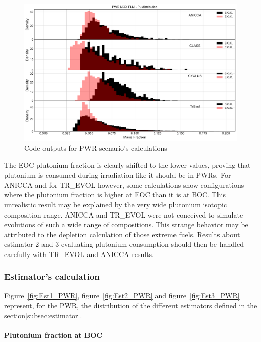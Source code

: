 \begin{figure}[h]
	\begin{center}
		\includegraphics[width = 0.99\textwidth]{../../Feature_1/RAW_DATA/FIG/PWR_MOX_FLM_Pu.pdf}
		\caption{Code outputs for \gls{PWR} scenario's calculations}
		\label{fig:PWR_MOX_FLM_Pu}
	\end{center}
\end{figure}

The \gls{EOC} plutonium fraction is clearly shifted to the lower values, proving that
plutonium is consumed during irradiation like it should be in \gls{PWR}s. For ANICCA
and for TR\_EVOL however, some calculations show configurations where the
plutonium fraction is higher at \gls{EOC} than it is at \gls{BOC}. This unrealistic
result may be explained by the very wide plutonium isotopic composition range.
ANICCA and TR\_EVOL were not conceived to simulate evolutions of such a wide range
of compositions. This strange behavior may be attributed to the depletion
calculation of those extreme fuels. Results about estimator 2 and 3 evaluating
plutonium consumption should then be handled carefully with TR\_EVOL and ANICCA
results.   


\subsubsection{Estimator's calculation}

Figure~\ref{fig:Est1_PWR}, figure~\ref{fig:Est2_PWR} and
figure~\ref{fig:Est3_PWR} represent, for the \gls{PWR}, the distribution of the
different estimators defined in the section\ref{subsec:estimator}. 

\paragraph{Plutonium fraction at \gls{BOC}}

